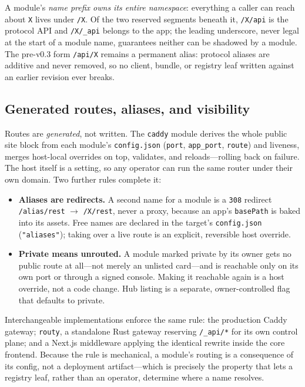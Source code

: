 \documentclass[11pt,a4paper]{article}
\begin{document}
A module's \emph{name prefix owns its entire namespace}: everything a caller can
reach about \texttt{X} lives under \texttt{/X}. Of the two reserved segments
beneath it, \texttt{/X/api} is the protocol API and \texttt{/X/\_api} belongs to
the app; the leading underscore, never legal at the start of a module name,
guarantees neither can be shadowed by a module. The pre-v0.3 form
\texttt{/api/X} remains a permanent alias: protocol aliases are additive and
never removed, so no client, bundle, or registry leaf written against an
earlier revision ever breaks.

\subsection{Generated routes, aliases, and visibility}

Routes are \emph{generated}, not written. The \texttt{caddy} module derives the
whole public site block from each module's \texttt{config.json}
(\texttt{port}, \texttt{app\_port}, \texttt{route}) and liveness, merges
host-local overrides on top, validates, and reloads---rolling back on failure.
The host itself is a setting, so any operator can run the same router under
their own domain. Two further rules complete it:

\begin{itemize}
    \item \textbf{Aliases are redirects.} A second name for a module is a
    \texttt{308} redirect \texttt{/alias/rest} $\to$ \texttt{/X/rest}, never a
    proxy, because an app's \texttt{basePath} is baked into its assets. Free
    names are declared in the target's \texttt{config.json}
    (\texttt{"aliases"}); taking over a live route is an explicit, reversible
    host override.
    \item \textbf{Private means unrouted.} A module marked private by its owner
    gets no public route at all---not merely an unlisted card---and is
    reachable only on its own port or through a signed console. Making it
    reachable again is a host override, not a code change. Hub listing is a
    separate, owner-controlled flag that defaults to private.
\end{itemize}

Interchangeable implementations enforce the same rule: the production Caddy
gateway; \texttt{routy}, a standalone Rust gateway reserving \texttt{/\_api/*}
for its own control plane; and a Next.js middleware applying the identical
rewrite inside the core frontend. Because the rule is mechanical, a module's
routing is a consequence of its config, not a deployment artifact---which is
precisely the property that lets a registry leaf, rather than an operator,
determine where a name resolves.
\end{document}
